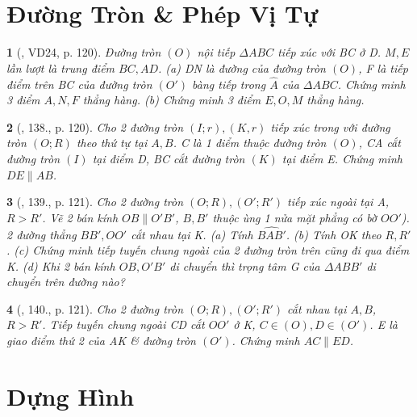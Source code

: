 \documentclass{article}
\newtheorem{baitoan}{}
\begin{document}

\section{Đường Tròn \& Phép Vị Tự}

\begin{baitoan}[\cite{Binh_Toan_9_tap_1}, VD24, p. 120]
	Đường tròn $(O)$ nội tiếp $\Delta ABC$ tiếp xúc với BC ở D. $M,E$ lần lượt là trung điểm $BC,AD$. (a) DN là đường của đường tròn $(O)$, F là tiếp điểm trên BC của đường tròn $(O')$ bàng tiếp trong $\widehat{A}$ của $\Delta ABC$. Chứng minh 3 điểm $A,N,F$ thẳng hàng. (b) Chứng minh 3 điểm $E,O,M$ thẳng hàng.
\end{baitoan}

\begin{baitoan}[\cite{Binh_Toan_9_tap_1}, 138., p. 120]
	Cho 2 đường tròn $(I;r),(K,r)$ tiếp xúc trong với đường tròn $(O;R)$ theo thứ tự tại $A,B$. C là 1 điểm thuộc đường tròn $(O)$, CA cắt đường tròn $(I)$ tại điểm D, BC cắt đường tròn $(K)$ tại điểm E. Chứng minh $DE\parallel AB$.
\end{baitoan}

\begin{baitoan}[\cite{Binh_Toan_9_tap_1}, 139., p. 121]
	Cho 2 đường tròn $(O;R),(O';R')$ tiếp xúc ngoài tại A, $R > R'$. Vẽ 2 bán kính $OB\parallel O'B'$, $B,B'$ thuộc ùng 1 nửa mặt phẳng có bờ $OO'$). 2 đường thẳng $BB',OO'$ cắt nhau tại K. (a) Tính $\widehat{BAB'}$. (b) Tính OK theo $R,R'$. (c) Chứng minh tiếp tuyến chung ngoài của 2 đường tròn trên cũng đi qua điểm K. (d) Khi 2 bán kính $OB,O'B'$ di chuyển thì trọng tâm G của $\Delta ABB'$ di chuyển trên đường nào?
\end{baitoan}

\begin{baitoan}[\cite{Binh_Toan_9_tap_1}, 140., p. 121]
	Cho 2 đường tròn $(O;R),(O';R')$ cắt nhau tại $A,B$, $R > R'$. Tiếp tuyến chung ngoài CD cắt $OO'$ ở K, $C\in(O),D\in(O')$. E là giao điểm thứ 2 của AK \& đường tròn $(O')$. Chứng minh $AC\parallel ED$.
\end{baitoan}


\section{Dựng Hình}
\end{document}
